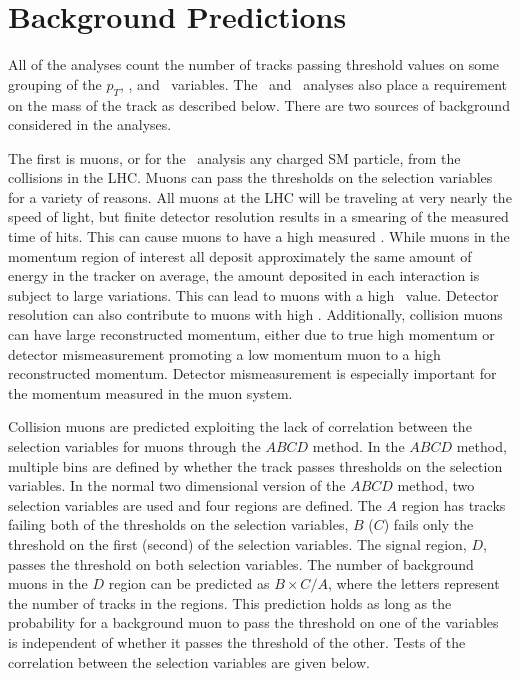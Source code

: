 \section{Background Predictions \label{BackPred}}
All of the analyses count the number of tracks passing threshold values on some grouping of the $p_T$, \invbeta, 
and \ias\ variables. The \tktof\  and \tkonly\ analyses also place a requirement on the mass of the track as described below. There are two sources
of background considered in the analyses. 

The first is muons, or for the \tkonly\ analysis any charged SM particle, from the collisions in the LHC. Muons can pass the thresholds on the selection variables
for a variety of reasons.
All muons at the LHC will be traveling at very nearly the speed of light,
but finite detector resolution results in a smearing of the measured time of hits. This can cause muons to have a high measured \invbeta.
While muons in the momentum region of interest all deposit approximately
the same amount of energy in the tracker on average, the amount deposited in each interaction is subject to large variations. This can lead to muons
with a high \dedx\ value. Detector resolution can also contribute to muons with high \dedx.
Additionally, collision muons can have large reconstructed momentum, either due to true high momentum or detector mismeasurement
promoting a low momentum muon to a high reconstructed momentum. Detector mismeasurement is especially important for the momentum measured in the muon system.

Collision muons are predicted exploiting the lack of correlation between the selection variables for muons through the $ABCD$ method.
In the $ABCD$ method, multiple bins are defined by whether the track passes thresholds on the selection variables. In the normal two dimensional version
of the $ABCD$ method, two selection variables are used and four regions are defined. The $A$ region has tracks failing both of the thresholds on the selection
variables, $B$ ($C$) fails only the threshold on the first (second) of the selection variables. The signal region, $D$, passes the threshold on both selection
variables. The number of background muons in the $D$ region can be predicted as $B \times C / A$, where the letters represent the number of tracks in the regions.
This prediction holds as long as the probability for a background
muon to pass the threshold on one of the variables is independent of whether it passes the threshold of the other. Tests of the correlation between the selection variables are
given below.

